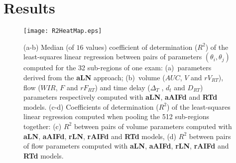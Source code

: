 \section{Results}
\begin{figure}[ht]
  \centering
  \texttt{[image: R2HeatMap.eps]}
  \caption{(a-b) Median (of $16$ values) coefficient of determination ($R^2$) of the least-squares linear regression between pairs of parameters $\left(\theta_i, \theta_j\right)$ computed for the 32 sub-regions of one exam: (a)~parameters derived from the \textbf{aLN} approach; (b)~volume ($AUC$, $V$ and $rV_{RT}$), flow ($WIR$, $F$ and $rF_{RT}$) and time delay ($\Delta_T$ , $d_t$ and $D_{RT}$) parameters respectively computed with \textbf{aLN}, \textbf{aAIFd}  and \textbf{RTd} models. (c-d) Coefficients of determination ($R^2$) of the least-squares linear regression computed when pooling the 512 sub-regions  together: (c) $R^2$ between pairs of volume parameters computed with \textbf{aLN}, \textbf{aAIFd}, \textbf{rLN}, \textbf{rAIFd}  and \textbf{RTd} models, (d) $R^2$ between pairs of flow parameters computed with \textbf{aLN}, \textbf{aAIFd}, \textbf{rLN}, \textbf{rAIFd} and \textbf{RTd} models.}
  \label{fig:R2HeatMaps}
\end{figure}

